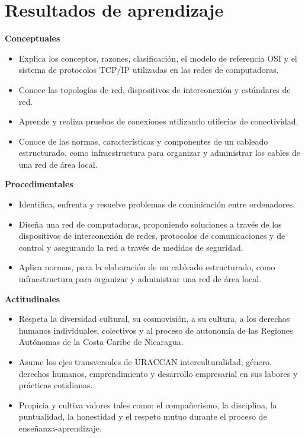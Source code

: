 \section*{Resultados de aprendizaje}

\large\textbf{Conceptuales}\par

\begin{itemize}
	\item Explica los conceptos, razones, clasificación, el modelo de referencia OSI y el sistema de protocolos TCP/IP utilizadas en las redes de computadoras.
	\item Conoce las topologías de red, dispositivos de interconexión y estándares de red.
	\item Aprende y realiza pruebas de conexiones utilizando utilerías de conectividad.
	\item Conoce de las normas, características y componentes de un cableado estructurado, como infraestructura para organizar y administrar los cables de una red de área local.
\end{itemize}

\large\textbf{Procedimentales}\par

\begin{itemize}
	\item Identifica, enfrenta y resuelve problemas de cominicación entre ordenadores.
	\item Diseña una red de computadoras, proponiendo soluciones a través de los dispositivos de interconexión de redes, protocolos de comunicaciones y de control y asegurando la red a través de medidas de seguridad.
	\item Aplica normas, para la elaboración de un cableado estructurado, como infraestructura para organizar y administrar una red de área local.
\end{itemize}

\large\textbf{Actitudinales}\par

\begin{itemize}
	\item Respeta la diversidad cultural, su cosmovisión, a su cultura, a los derechos humanos individuales, colectivos y al proceso de autonomía de las Regiones Autónomas de la Costa Caribe de Nicaragua.
	\item Asume los ejes transversales de URACCAN\: interculturalidad, género, derechos humanos, emprendimiento y desarrollo empresarial en sus labores y prácticas cotidianas.
	\item Propicia y cultiva valores tales como: el compañerismo, la disciplina, la puntualidad, la honestidad y el respeto mutuo durante el proceso de enseñanza-aprendizaje.
\end{itemize}